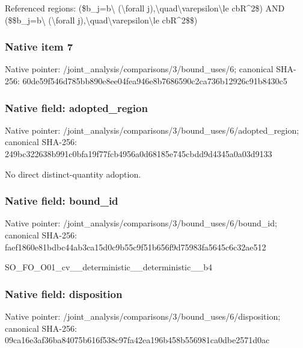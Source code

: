\documentclass[10pt,a4paper]{article}
\begin{document}
\begingroup\raggedright\sloppy Referenced regions:\allowbreak{} (\$b\_\allowbreak{}j=\allowbreak{}b\textbackslash{} (\textbackslash{}forall j),\allowbreak{}\textbackslash{}quad\textbackslash{}varepsilon\textbackslash{}le cbR\textasciicircum{}2\$) AND (\$\$b\_\allowbreak{}j=\allowbreak{}b\textbackslash{} (\textbackslash{}forall j),\allowbreak{}\textbackslash{}quad\textbackslash{}varepsilon\textbackslash{}le cbR\textasciicircum{}2\$\$)\par\endgroup

\subsubsection{Native item 7}
Native pointer: /joint\_\allowbreak{}analysis/comparisons/3/bound\_\allowbreak{}uses/6; canonical SHA-256: 60de59f546d785bb890e8ee04fea946e8b7686590c2ca736b12926c91b8430c5

\subsubsection{Native field: adopted\_\allowbreak{}region}
Native pointer: /joint\_\allowbreak{}analysis/comparisons/3/bound\_\allowbreak{}uses/6/adopted\_\allowbreak{}region; canonical SHA-256: 249bc322638b991c0bfa19f77fcb4956a0d68185e745cbdd9d4345a0a03d9133

\begingroup\raggedright\sloppy No direct distinct-quantity adoption.\par\endgroup

\subsubsection{Native field: bound\_\allowbreak{}id}
Native pointer: /joint\_\allowbreak{}analysis/comparisons/3/bound\_\allowbreak{}uses/6/bound\_\allowbreak{}id; canonical SHA-256: faef1860e81bdbc44ab3ca15d0c9b55c9f51b656f9d75983fa5645c6c32ae512

\begingroup\raggedright\sloppy SO\_\allowbreak{}FO\_\allowbreak{}O01\_\allowbreak{}cv\_\allowbreak{}\_\allowbreak{}deterministic\_\allowbreak{}\_\allowbreak{}deterministic\_\allowbreak{}\_\allowbreak{}b4\par\endgroup

\subsubsection{Native field: disposition}
Native pointer: /joint\_\allowbreak{}analysis/comparisons/3/bound\_\allowbreak{}uses/6/disposition; canonical SHA-256: 09ca16e3af36ba84075b616f538c97fa42ea196b458b556981ca0dbe2571d0ac
\end{document}
